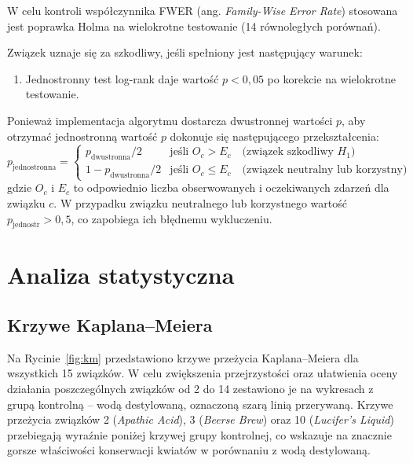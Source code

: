 \documentclass[12pt, a4paper]{article}
\begin{document}
W celu kontroli współczynnika FWER (ang. \textit{Family-Wise Error Rate}) stosowana jest poprawka Holma na wielokrotne testowanie (14 równoległych porównań).

Związek uznaje się za szkodliwy, jeśli spełniony jest następujący warunek:

\begin{enumerate}[label=\arabic*)]
    \item Jednostronny test log-rank daje wartość $p < 0{,}05$ po korekcie na wielokrotne testowanie.
\end{enumerate}

Ponieważ implementacja algorytmu dostarcza dwustronnej wartości $p$, aby otrzymać jednostronną wartość $p$ dokonuje się następującego przekształcenia:
\[
    p_{\text{jednostronna}} = \begin{cases}
        p_{\text{dwustronna}} / 2 & \text{jeśli } O_c > E_c \quad \text{(związek szkodliwy } H_1\text{)} \\
        1 - p_{\text{dwustronna}} / 2 & \text{jeśli } O_c \leq E_c \quad \text{(związek neutralny lub korzystny)}
    \end{cases}
\]
gdzie $O_c$ i $E_c$ to odpowiednio liczba obserwowanych i oczekiwanych zdarzeń dla związku $c$.
W przypadku związku neutralnego lub korzystnego wartość $p_{\text{jednostr}} > 0{,}5$, co zapobiega ich błędnemu wykluczeniu.

\section{Analiza statystyczna}

\subsection{Krzywe Kaplana--Meiera}

Na Rycinie~\ref{fig:km} przedstawiono krzywe przeżycia Kaplana--Meiera dla wszystkich
15 związków. W celu zwiększenia przejrzystości oraz ułatwienia oceny działania poszczególnych związków od 2 do 14 zestawiono je na wykresach z grupą kontrolną -- wodą destylowaną, oznaczoną szarą linią przerywaną. Krzywe przeżycia związków 2 (\textit{Apathic Acid}), 3 (\textit{Beerse Brew}) oraz 10 (\textit{Lucifer's Liquid}) przebiegają wyraźnie poniżej krzywej grupy kontrolnej, co wskazuje na znacznie gorsze właściwości konserwacji kwiatów w porównaniu z wodą destylowaną.
\end{document}
